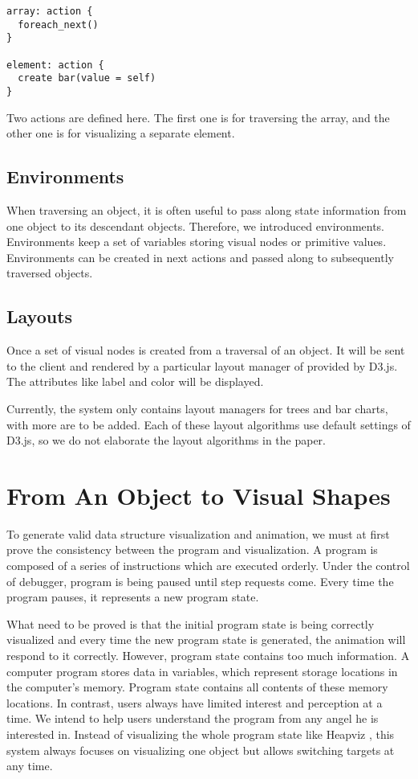 \begin{lstlisting}
array: action {
  foreach_next()
}

element: action {
  create bar(value = self)
}
\end{lstlisting}

Two actions are defined here. The first one is for traversing the array, and the other one is for visualizing a separate element.

\subsection {Environments}
When traversing an object, it is often useful to pass along state information from one object to its descendant objects. Therefore, we introduced environments. Environments keep a set of variables storing visual nodes or primitive values. Environments can be created in next actions and passed along to subsequently traversed objects.

\subsection {Layouts}
Once a set of visual nodes is created from a traversal of an object. It will be sent to the client and rendered by a particular layout manager of provided by D3.js. The attributes like label and color will be displayed.

Currently, the system only contains layout managers for trees and bar charts, with more are to be added. Each of these layout algorithms use default settings of D3.js, so we do not elaborate the layout algorithms in the paper.  

\section {From An Object to Visual Shapes}
To generate valid data structure visualization and animation, we must at first prove the consistency between the program and visualization. A program is composed of a series of instructions which are executed orderly. Under the control of debugger, program is being paused until step requests come. Every time the program pauses, it represents a new program state. 

What need to be proved is that the initial program state is being correctly visualized and every time the new program state is generated, the animation will respond to it correctly. However, program state contains too much information. A computer program stores data in variables, which represent storage locations in the computer's memory. Program state contains all contents of these memory locations. In contrast, users always have limited interest and perception at a time. We intend to help users understand the program from any angel he is interested in. Instead of visualizing the whole program state like Heapviz \cite{Aftandilian:2010:HIH:1879211.1879222}, this system always focuses on visualizing one object but allows switching targets at any time.

